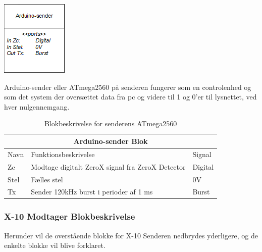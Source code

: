 \documentclass[11pt]{article}
\begin{document}
\begin{minipage}[Ht]{0.40\linewidth}
	\centering
	\includegraphics{Arduino-sender-blok.png}
\end{minipage}
\hfill
\begin{minipage}[!t]{0.60\linewidth}
	\centering
   		Arduino-sender eller ATmega2560 på senderen fungerer som en controlenhed og som det system der oversættet data fra pc og videre til 1 og 0'er til lysnettet, ved hver nulgennemgang. 
 \end{minipage}%
\hfill

\begin{table}[H]
\centering
	\begin{tabular}{l|l|l}
	
	\toprule[0.4mm]\midrule \multicolumn{3}{c}{\textbf{Arduino-sender Blok}}\\
	\midrule[0.4mm] Navn & Funktionsbeskrivelse & Signal\\ \midrule[0.3mm]
	 Zc & Modtage digitalt ZeroX signal fra ZeroX Detector & Digital\\
	 Stel & Fælles stel  & 0V\\
	 Tx & Sender 120kHz burst i perioder af 1 ms & Burst\\
	 \midrule\bottomrule[0.4mm]

	\end{tabular}
	\caption{Blokbeskrivelse for senderens ATmega2560}
	\label{tab: Bloktabel ATmega2560 sender}
\end{table}
\qquad


\subsubsection*{X-10 Modtager Blokbeskrivelse}
Herunder vil de overstående blokke for X-10 Senderen nedbrydes yderligere, og de enkelte blokke vil blive forklaret.\newline
\end{document}
